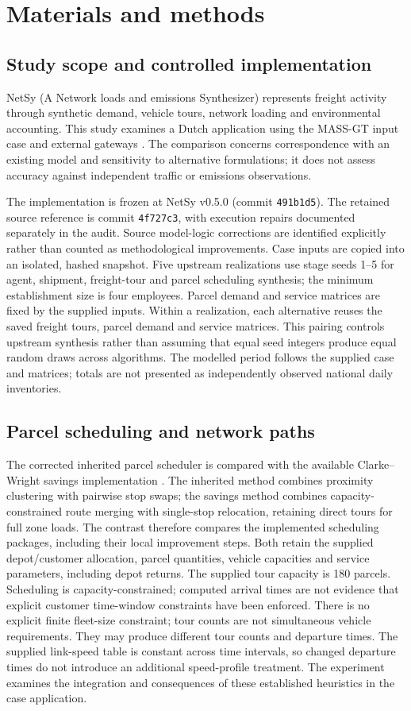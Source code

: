\section{Materials and methods}
\subsection{Study scope and controlled implementation}
NetSy (A Network loads and emissions Synthesizer) represents freight activity
through synthetic demand, vehicle tours, network loading and environmental
accounting. This study examines a Dutch application using the MASS-GT input
case and external gateways \parencite{massgt2025}. The comparison concerns correspondence with an
existing model and sensitivity to alternative formulations; it does not assess
accuracy against independent traffic or emissions observations.

The implementation is frozen at NetSy v0.5.0 (commit \texttt{491b1d5}).
The retained source reference is commit \texttt{4f727c3}, with execution
repairs documented separately in the audit. Source model-logic corrections
are identified explicitly rather than counted as methodological improvements.
Case inputs are copied into an isolated, hashed snapshot. Five upstream
realizations use stage seeds 1--5 for agent, shipment, freight-tour and parcel
scheduling synthesis; the minimum establishment size is four employees.
Parcel demand and service matrices are fixed by the supplied inputs.
Within a realization, each alternative reuses the saved freight tours, parcel
demand and service matrices. This pairing controls upstream synthesis rather
than assuming that equal seed integers produce equal random draws across
algorithms. The modelled period follows the supplied case and matrices;
totals are not presented as independently observed national daily inventories.

\subsection{Parcel scheduling and network paths}
The corrected inherited parcel scheduler is compared with the available
Clarke--Wright savings implementation \parencite{clarke1964}. The inherited method combines proximity clustering with pairwise stop swaps;
the savings method combines capacity-constrained route merging with single-stop
relocation, retaining direct tours for full zone loads. The contrast therefore
compares the implemented scheduling packages, including their local improvement
steps. Both retain the supplied depot/customer
allocation, parcel quantities, vehicle capacities and service parameters,
including depot returns. The supplied tour capacity is 180 parcels. Scheduling is capacity-constrained;
computed arrival times are not evidence that explicit customer time-window
constraints have been enforced. There is no explicit finite fleet-size
constraint; tour counts are not simultaneous vehicle requirements. They may produce different tour counts and departure
times. The supplied link-speed table is constant across time intervals, so
changed departure times do not introduce an additional speed-profile treatment.
The experiment examines the integration and consequences of these established
heuristics in the case application.


